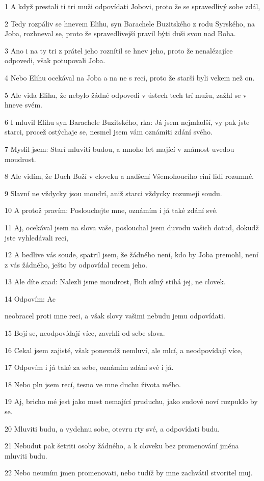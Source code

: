\par 1 A když prestali ti tri muži odpovídati Jobovi, proto že se spravedlivý sobe zdál,
\par 2 Tedy rozpáliv se hnevem Elihu, syn Barachele Buzitského z rodu Syrského, na Joba, rozhneval se, proto že spravedlivejší pravil býti duši svou nad Boha.
\par 3 Ano i na ty tri z prátel jeho roznítil se hnev jeho, proto že nenalézajíce odpovedi, však potupovali Joba.
\par 4 Nebo Elihu ocekával na Joba a na ne s recí, proto že starší byli vekem než on.
\par 5 Ale vida Elihu, že nebylo žádné odpovedi v ústech tech trí mužu, zažhl se v hneve svém.
\par 6 I mluvil Elihu syn Barachele Buzitského, rka: Já jsem nejmladší, vy pak jste starci, procež ostýchaje se, nesmel jsem vám oznámiti zdání svého.
\par 7 Myslil jsem: Starí mluviti budou, a mnoho let mající v známost uvedou moudrost.
\par 8 Ale vidím, že Duch Boží v cloveku a nadšení Všemohoucího ciní lidi rozumné.
\par 9 Slavní ne vždycky jsou moudrí, aniž starci vždycky rozumejí soudu.
\par 10 A protož pravím: Poslouchejte mne, oznámím i já také zdání své.
\par 11 Aj, ocekával jsem na slova vaše, poslouchal jsem duvodu vašich dotud, dokudž jste vyhledávali reci,
\par 12 A bedlive vás soude, spatril jsem, že žádného není, kdo by Joba premohl, není z vás žádného, ješto by odpovídal recem jeho.
\par 13 Ale díte snad: Nalezli jsme moudrost, Buh silný stihá jej, ne clovek.
\par 14 Odpovím: Ac \par neobracel proti mne reci, a však slovy vašimi nebudu jemu odpovídati.
\par 15 Bojí se, neodpovídají více, zavrhli od sebe slova.
\par 16 Cekal jsem zajisté, však ponevadž nemluví, ale mlcí, a neodpovídají více,
\par 17 Odpovím i já také za sebe, oznámím zdání své i já.
\par 18 Nebo pln jsem recí, tesno ve mne duchu života mého.
\par 19 Aj, bricho mé jest jako mest nemající pruduchu, jako sudové noví rozpuklo by se.
\par 20 Mluviti budu, a vydchnu sobe, otevru rty své, a odpovídati budu.
\par 21 Nebudut pak šetriti osoby žádného, a k cloveku bez promenování jména mluviti budu.
\par 22 Nebo neumím jmen promenovati, nebo tudíž by mne zachvátil stvoritel muj.

